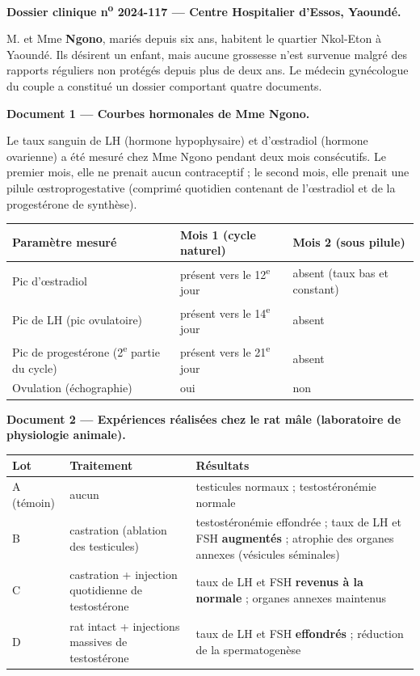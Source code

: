 \documentclass[11pt]{article}
\newcounter{popsec}
\newcounter{popsub}
\newcommand{\courssub}[1]{%
  \stepcounter{popsub}%
  \par\vspace{9pt}\noindent{\popxbold\fontsize{11.5}{13}\selectfont\color{popink}{\color{poporange}\thepopsec.\thepopsub}\hspace{6pt}#1}\par\nopagebreak\vspace{4pt}
}
\begin{document}
\courssub{Situation}

\textbf{Dossier clinique n\textsuperscript{o} 2024-117 — Centre Hospitalier d'Essos, Yaoundé.}

M. et Mme \textbf{Ngono}, mariés depuis six ans, habitent le quartier Nkol-Eton à Yaoundé. Ils désirent un enfant, mais aucune grossesse n'est survenue malgré des rapports réguliers non protégés depuis plus de deux ans. Le médecin gynécologue du couple a constitué un dossier comportant quatre documents.

\textbf{Document 1 — Courbes hormonales de Mme Ngono.}

Le taux sanguin de LH (hormone hypophysaire) et d'{\oe}stradiol (hormone ovarienne) a été mesuré chez Mme Ngono pendant deux mois consécutifs. Le premier mois, elle ne prenait aucun contraceptif ; le second mois, elle prenait une pilule {\oe}stroprogestative (comprimé quotidien contenant de l'{\oe}stradiol et de la progestérone de synthèse).

\begin{center}
\begin{tabularx}{\linewidth}{|l|X|X|}
\hline
\rowcolor{popblueL} \textbf{Paramètre mesuré} & \textbf{Mois 1 (cycle naturel)} & \textbf{Mois 2 (sous pilule)} \\
\hline
Pic d'{\oe}stradiol & présent vers le 12\textsuperscript{e} jour & absent (taux bas et constant) \\
\hline
Pic de LH (pic ovulatoire) & présent vers le 14\textsuperscript{e} jour & absent \\
\hline
Pic de progestérone (2\textsuperscript{e} partie du cycle) & présent vers le 21\textsuperscript{e} jour & absent \\
\hline
Ovulation (échographie) & oui & non \\
\hline
\end{tabularx}
\end{center}

\textbf{Document 2 — Expériences réalisées chez le rat mâle (laboratoire de physiologie animale).}

\begin{center}
\begin{tabularx}{\linewidth}{|l|X|X|}
\hline
\rowcolor{popblueL} \textbf{Lot} & \textbf{Traitement} & \textbf{Résultats} \\
\hline
A (témoin) & aucun & testicules normaux ; testostéronémie normale \\
\hline
B & castration (ablation des testicules) & testostéronémie effondrée ; taux de LH et FSH \textbf{augmentés} ; atrophie des organes annexes (vésicules séminales) \\
\hline
C & castration + injection quotidienne de testostérone & taux de LH et FSH \textbf{revenus à la normale} ; organes annexes maintenus \\
\hline
D & rat intact + injections massives de testostérone & taux de LH et FSH \textbf{effondrés} ; réduction de la spermatogenèse \\
\hline
\end{tabularx}
\end{center}
\end{document}
